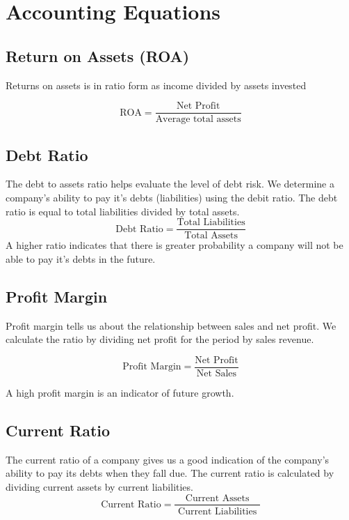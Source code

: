 \documentclass[../main.tex]{subfiles}
\begin{document}
	\section{Accounting Equations}
	
	\subsection{Return on Assets (ROA)}
	
	Returns on assets is in ratio form as income divided by assets invested \ie 
	
	\[
	\text{ROA} = \frac{\text{Net Profit}}{\text{Average total assets}}
	\]
	
	\subsection{Debt Ratio}
	
	The debt to assets ratio helps evaluate the level of debt risk. We 
	determine a company’s ability to pay it’s debts (liabilities) using the 
	debit ratio. The debt ratio is equal to total liabilities divided by total 
	assets.  
	\[
	\text{Debt Ratio} = \frac{\text{Total Liabilities}}{\text{Total Assets}}
	\]
	A higher ratio indicates that there is greater probability a 
	company will not be able to pay it’s debts in the future.
	
	\subsection{Profit Margin}
	
	Profit margin tells us about the relationship between sales and net 
	profit. We calculate the ratio by dividing net profit for the period by 
	sales revenue.
	
	\[
	\text{Profit Margin} = \frac{\text{Net Profit}}{\text{Net Sales}}
	\]
	
	A high profit margin is an indicator of future growth.
	
	\subsection{Current Ratio}
	
	The current ratio of a company gives us a good indication of the company’s 
	ability to pay its debts when they fall due. The current ratio is 
	calculated by dividing current assets by current liabilities. 
	\[
	\text{Current Ratio} = \frac{\text { Current Assets }}{\text { Current 
	Liabilities }}
	\]
	
\end{document}
